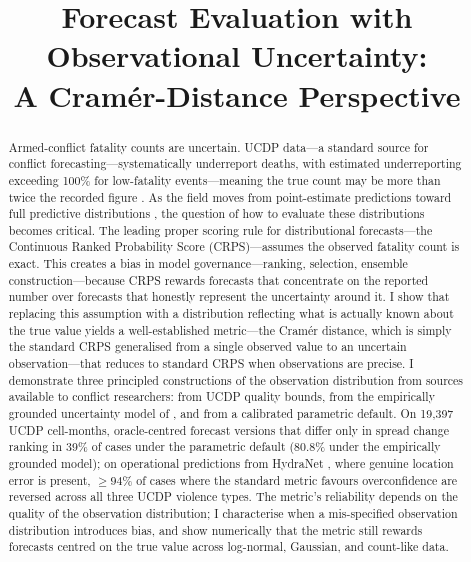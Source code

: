 \documentclass[11pt,a4paper]{article}
\title{Forecast Evaluation with Observational Uncertainty:\\ A Cram\'er-Distance Perspective}
\begin{document}
\maketitle

\begin{abstract}
\noindent Armed-conflict fatality counts are uncertain. UCDP data---a standard source for conflict forecasting---systematically underreport deaths, with estimated underreporting exceeding 100\% for low-fatality events---meaning the true count may be more than twice the recorded figure \citep{vesco2026uncertainty}. As the field moves from point-estimate predictions toward full predictive distributions \citep{hegre2025prediction}, the question of how to evaluate these distributions becomes critical. The leading proper scoring rule for distributional forecasts---the Continuous Ranked Probability Score (CRPS)---assumes the observed fatality count is exact. This creates a bias in model governance---ranking, selection, ensemble construction---because CRPS rewards forecasts that concentrate on the reported number over forecasts that honestly represent the uncertainty around it. I show that replacing this assumption with a distribution reflecting what is actually known about the true value yields a well-established metric---the Cram\'er distance, which is simply the standard CRPS generalised from a single observed value to an uncertain observation---that reduces to standard CRPS when observations are precise. I demonstrate three principled constructions of the observation distribution from sources available to conflict researchers: from UCDP quality bounds, from the empirically grounded uncertainty model of \citet{vesco2026uncertainty}, and from a calibrated parametric default. On 19{,}397 UCDP cell-months, oracle-centred forecast versions that differ only in spread change ranking in 39\% of cases under the parametric default (80.8\% under the empirically grounded model); on operational predictions from HydraNet \citep{VonDerMaase2025hydranet}, where genuine location error is present, $\geq 94\%$ of cases where the standard metric favours overconfidence are reversed across all three UCDP violence types. The metric's reliability depends on the quality of the observation distribution; I characterise when a mis-specified observation distribution introduces bias, and show numerically that the metric still rewards forecasts centred on the true value across log-normal, Gaussian, and count-like data.
\end{abstract}
\end{document}
